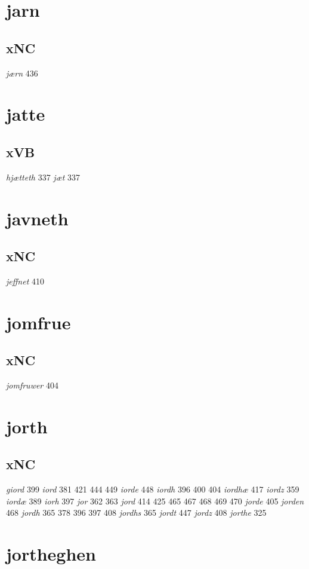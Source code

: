 \documentclass[a4paper,twocolumn]{article}
\begin{document}
\section{jarn}
\label{sec:orgfe745b9}
\subsection{xNC}
\label{sec:org5673211}
\emph{jærn} 436 
\section{jatte}
\label{sec:orgababaa1}
\subsection{xVB}
\label{sec:org36a8e10}
\emph{hjætteth} 337 \emph{jæt} 337 
\section{javneth}
\label{sec:org5943406}
\subsection{xNC}
\label{sec:org838c4db}
\emph{jeffnet} 410 
\section{jomfrue}
\label{sec:orgd3bc017}
\subsection{xNC}
\label{sec:org9dbd861}
\emph{jomfruwer} 404 
\section{jorth}
\label{sec:org3bc17b5}
\subsection{xNC}
\label{sec:orgac3fc42}
\emph{giord} 399 \emph{iord} 381 421 444 449 \emph{iorde} 448 \emph{iordh} 396 400 404 \emph{iordhæ} 417 \emph{iordz} 359 \emph{iordæ} 389 \emph{iorh} 397 \emph{jor} 362 363 \emph{jord} 414 425 465 467 468 469 470 \emph{jorde} 405 \emph{jorden} 468 \emph{jordh} 365 378 396 397 408 \emph{jordhs} 365 \emph{jordt} 447 \emph{jordz} 408 \emph{jorthe} 325 
\section{jortheghen}
\label{sec:org3c6b801}
\end{document}
